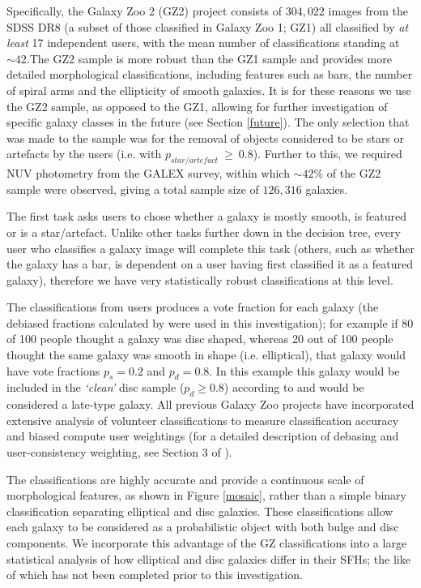 \documentclass[useAMS,usenatbib]{mn2e}
\def\changed    {\color{titlecol} }
\begin{document}
Specifically, the Galaxy Zoo 2 (GZ2) project consists of $304, 022$ images from the SDSS DR8 (a subset of those classified in Galaxy Zoo 1; GZ1) all classified by \emph{at least} 17 independent users, with the mean number of classifications standing at $\sim42$.The GZ2 sample is more robust than the GZ1 sample and provides more detailed morphological classifications, including features such as bars, the number of spiral arms and the ellipticity of smooth galaxies. It is for these reasons we use the GZ2 sample, as opposed to the GZ1, allowing for further investigation of specific galaxy classes in the future (see Section \ref{future}). The only selection that was made to the sample was for the removal of  objects considered to be stars or artefacts by the users (i.e. with $p_{star/artefact} ~\geq~ 0.8$). Further to this, we required NUV photometry from the GALEX survey, within which $\sim42\%$ of the GZ2 sample were observed, giving a total sample size of $126, 316$ galaxies. 

The first task asks users to chose whether a galaxy is mostly smooth, is featured or is a star/artefact. Unlike other tasks further down in the decision tree, every user who classifies a galaxy image will complete this task (others, such as whether the galaxy has a bar, is dependent on a user having first classified it as a featured galaxy), therefore we have very statistically robust classifications at this level.

The classifications from users produces a vote fraction for each galaxy (the debiased fractions calculated by \citet{GZ2} were used in this investigation); for example if 80 of 100 people thought a galaxy was disc shaped, whereas 20 out of 100 people thought the same galaxy was smooth in shape (i.e. elliptical), that galaxy would have vote fractions $p_{s} = 0.2$ and $p_{d} = 0.8$. In this example this galaxy would be included in the \emph{`clean'} disc sample ($p_d \geq 0.8$) according to \cite{GZ2} and would be considered a late-type galaxy. {\changed All previous Galaxy Zoo projects have incorporated extensive analysis of volunteer classifications to measure classification accuracy and biased compute user weightings (for a detailed description of debasing and user-consistency weighting, see Section 3 of \citealt{GZ2}). }

{\changed The classifications are highly accurate and provide a continuous scale of morphological features, as shown in Figure \ref{mosaic}, rather than a simple binary classification separating elliptical and disc galaxies. These classifications allow each galaxy to be considered as a probabilistic object with both bulge and disc components.} We incorporate this advantage of the GZ classifications into a large statistical analysis of how elliptical and disc galaxies differ in their SFHs; the like of which has not been completed prior to this investigation.
\end{document}
